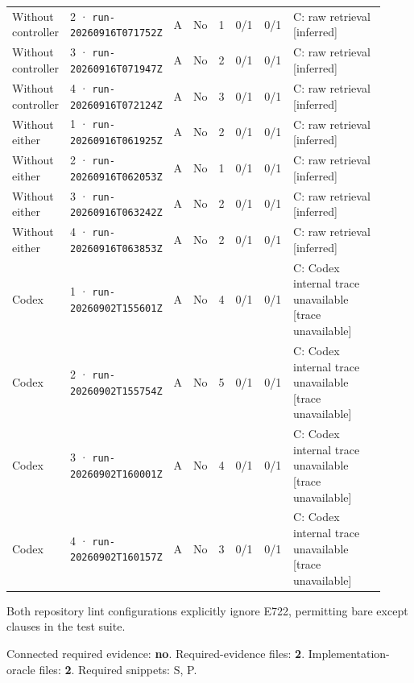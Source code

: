 \begin{landscape}
\begin{longtable}{@{}L{0.11\linewidth}L{0.16\linewidth}*{1}{L{0.022\linewidth}}L{0.05\linewidth}L{0.045\linewidth}L{0.08\linewidth}L{0.085\linewidth}L{0.368\linewidth}@{}}
Without controller & 2 · \texttt{run-20260916\allowbreak T071752Z} & A & No & 1 & 0/1 & 0/1 & C: raw retrieval [inferred] \\
Without controller & 3 · \texttt{run-20260916\allowbreak T071947Z} & A & No & 2 & 0/1 & 0/1 & C: raw retrieval [inferred] \\
Without controller & 4 · \texttt{run-20260916\allowbreak T072124Z} & A & No & 3 & 0/1 & 0/1 & C: raw retrieval [inferred] \\
Without either & 1 · \texttt{run-20260916\allowbreak T061925Z} & A & No & 2 & 0/1 & 0/1 & C: raw retrieval [inferred] \\
Without either & 2 · \texttt{run-20260916\allowbreak T062053Z} & A & No & 1 & 0/1 & 0/1 & C: raw retrieval [inferred] \\
Without either & 3 · \texttt{run-20260916\allowbreak T063242Z} & A & No & 2 & 0/1 & 0/1 & C: raw retrieval [inferred] \\
Without either & 4 · \texttt{run-20260916\allowbreak T063853Z} & A & No & 2 & 0/1 & 0/1 & C: raw retrieval [inferred] \\
Codex & 1 · \texttt{run-20260902\allowbreak T155601Z} & A & No & 4 & 0/1 & 0/1 & C: Codex internal trace unavailable [trace unavailable] \\
Codex & 2 · \texttt{run-20260902\allowbreak T155754Z} & A & No & 5 & 0/1 & 0/1 & C: Codex internal trace unavailable [trace unavailable] \\
Codex & 3 · \texttt{run-20260902\allowbreak T160001Z} & A & No & 4 & 0/1 & 0/1 & C: Codex internal trace unavailable [trace unavailable] \\
Codex & 4 · \texttt{run-20260902\allowbreak T160157Z} & A & No & 3 & 0/1 & 0/1 & C: Codex internal trace unavailable [trace unavailable] \\
\end{longtable}
\endgroup
\end{landscape}

\label{sec:pandas-dev-pandas-22872}

Both repository lint configurations explicitly ignore E722, permitting bare except clauses in the test suite.

Connected required evidence: \textbf{no}. Required-evidence files: \textbf{2}. Implementation-oracle files: \textbf{2}. Required snippets: S, P.

